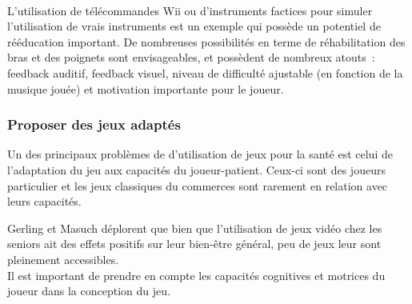 \paragraph{} L'utilisation de télécommandes Wii ou d'instruments factices pour simuler l'utilisation de vrais instruments est un exemple qui possède un potentiel de rééducation important. De nombreuses possibilités en terme de réhabilitation des bras et des poignets sont envisageables, et possèdent de nombreux atouts~: feedback auditif, feedback visuel, niveau de difficulté ajustable (en fonction de la musique jouée) et motivation importante pour le joueur.

		\subsubsection{Proposer des jeux adaptés}
Un des principaux problèmes de d'utilisation de jeux pour la santé est celui de l'adaptation du jeu aux capacités du joueur-patient\cite{Flor08}. Ceux-ci sont des joueurs particulier et les jeux classiques du commerces sont rarement en relation avec leurs capacités.

Gerling et Masuch\cite{Gerl11} déplorent que bien que l'utilisation de jeux vidéo chez les seniors ait des effets positifs sur leur bien-être général, peu de jeux leur sont pleinement accessibles.\\
Il est important de prendre en compte les capacités cognitives et motrices du joueur dans la conception du jeu.

